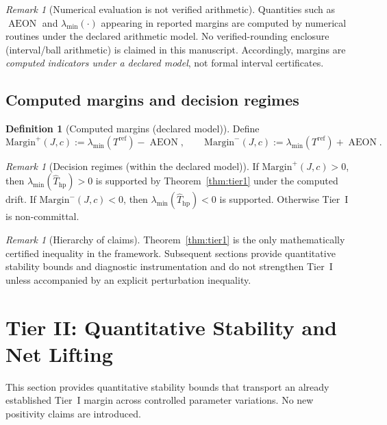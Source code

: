 \documentclass[12pt,reqno]{amsart}
\numberwithin{equation}{section}
\theoremstyle{definition}
\newtheorem{definition}[theorem]{Definition}
\theoremstyle{remark}
\newtheorem{remark}[theorem]{Remark}
\DeclareMathOperator{\AEON}{AEON}
\begin{document}
\begin{remark}[Numerical evaluation is not verified arithmetic]
\label{rem:no_verified}
Quantities such as $\AEON$ and $\lambda_{\min}(\cdot)$ appearing in reported margins
are computed by numerical routines under the declared arithmetic model. No
verified-rounding enclosure (interval/ball arithmetic) is claimed in this manuscript.
Accordingly, margins are \emph{computed indicators under a declared model}, not
formal interval certificates.
\end{remark}

\subsection{Computed margins and decision regimes}
\begin{definition}[Computed margins (declared model)]
\label{def:margins}
Define
\[
\mathrm{Margin}^+(J,c):=\lambda_{\min}(T^{\mathrm{ref}})-\AEON,
\qquad
\mathrm{Margin}^-(J,c):=\lambda_{\min}(T^{\mathrm{ref}})+\AEON.
\]
\end{definition}

\begin{remark}[Decision regimes (within the declared model)]
\label{rem:regimes}
If $\mathrm{Margin}^+(J,c)>0$, then $\lambda_{\min}(\widehat T_{\mathrm{hp}})>0$
is supported by Theorem~\ref{thm:tier1} under the computed drift. If
$\mathrm{Margin}^-(J,c)<0$, then $\lambda_{\min}(\widehat T_{\mathrm{hp}})<0$
is supported. Otherwise Tier~I is non-committal.
\end{remark}

\begin{remark}[Hierarchy of claims]
\label{rem:tier_hierarchy}
Theorem~\ref{thm:tier1} is the only mathematically certified inequality in the
framework. Subsequent sections provide quantitative stability bounds and diagnostic
instrumentation and do not strengthen Tier~I unless accompanied by an explicit
perturbation inequality.
\end{remark}

\section{Tier II: Quantitative Stability and Net Lifting}
\label{sec:tier2}

This section provides quantitative stability bounds that transport an already
established Tier~I margin across controlled parameter variations. No new positivity
claims are introduced.
\end{document}
